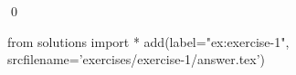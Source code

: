 
\begin{ex} 
  \label{ex:exercise-1}
  
  \qed
\end{ex} 
\begin{python0}
from solutions import *
add(label="ex:exercise-1",
    srcfilename='exercises/exercise-1/answer.tex') 
\end{python0}
